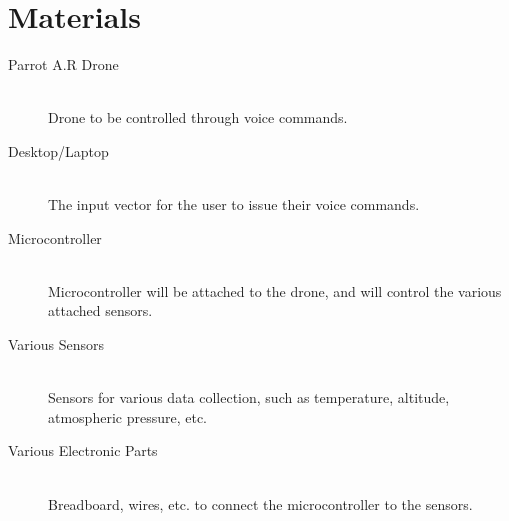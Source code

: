 \documentclass{article}
\begin{document}
	\section{Materials}
	\begin{description}
	  \item[Parrot A.R Drone] \hfill \\
	  Drone to be controlled through voice commands. 
	  \item[Desktop/Laptop] \hfill \\
	  The input vector for the user to issue their voice commands. 
	  \item[Microcontroller] \hfill \\
	  Microcontroller will be attached to the drone, and will control the various attached sensors. 
	  \item[Various Sensors] \hfill \\
	  Sensors for various data collection, such as temperature, altitude, atmospheric pressure, etc.
	  \item[Various Electronic Parts] \hfill \\
	  Breadboard, wires, etc. to connect the microcontroller to the sensors. 
	\end{description}



\end{document}
